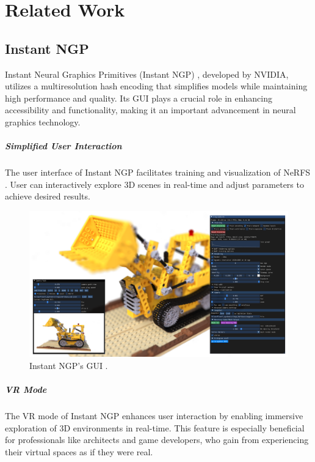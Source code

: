 %
\chapter{Related Work}
\label{sec:related}

\section{Instant NGP}

Instant Neural Graphics Primitives (Instant NGP) \cite{muller_instant_2022}, developed by NVIDIA, utilizes a multiresolution hash encoding that simplifies models while maintaining high performance and quality.
Its GUI plays a crucial role in enhancing accessibility and functionality, making it an important advancement in neural graphics technology.

\paragraph{Simplified User Interaction}
The user interface of Instant NGP facilitates training and visualization of NeRFS .
User can interactively explore 3D scenes in real-time and adjust parameters to achieve desired results.

\begin{figure}[h!]
  \centering
  \includegraphics[width=\textwidth]{figures/realted-instant-ngp.png}
  \caption{Instant NGP's GUI \cite{muller_instant_2022}.}
  \label{fig:instant-ngp}
\end{figure}

\paragraph{VR Mode}
The VR mode of Instant NGP enhances user interaction by enabling immersive exploration of 3D environments in real-time.
This feature is especially beneficial for professionals like architects and game developers, who gain from experiencing their virtual spaces as if they were real.

